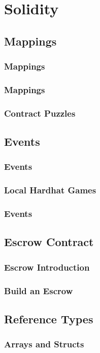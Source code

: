 \documentclass[a4paper, oneside]{book}
\begin{document}
\chapter{Solidity}

\section{Mappings}
\subsection{Mappings}
\subsection{Mappings}
\subsection{Contract Puzzles}

\section{Events}
\subsection{Events}
\subsection{Local Hardhat Games}
\subsection{Events}

\section{Escrow Contract}
\subsection{Escrow Introduction}
\subsection{Build an Escrow}

\section{Reference Types}
\subsection{Arrays and Structs}
\end{document}
